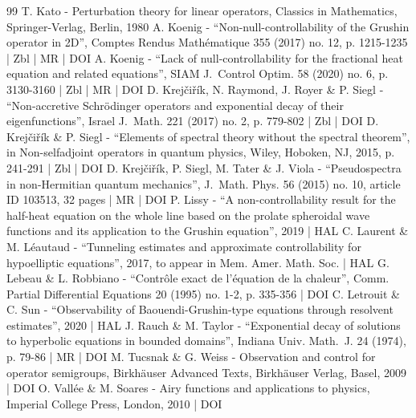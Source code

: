 \begin{thebibliography}{99}
T. Kato - Perturbation theory for linear operators, Classics in Mathematics, Springer-Verlag, Berlin, 1980
A. Koenig - “Non-null-controllability of the Grushin operator in 2D”, Comptes Rendus Mathématique 355 (2017) no. 12, p. 1215-1235 | Zbl | MR | DOI
A. Koenig - “Lack of null-controllability for the fractional heat equation and related equations”, SIAM J. Control Optim. 58 (2020) no. 6, p. 3130-3160 | Zbl | MR | DOI
D. Krejčiřík, N. Raymond, J. Royer \& P. Siegl - “Non-accretive Schrödinger operators and exponential decay of their eigenfunctions”, Israel J. Math. 221 (2017) no. 2, p. 779-802 | Zbl | DOI
D. Krejčiřík \& P. Siegl - “Elements of spectral theory without the spectral theorem”, in Non-selfadjoint operators in quantum physics, Wiley, Hoboken, NJ, 2015, p. 241-291 | Zbl | DOI
D. Krejčiřík, P. Siegl, M. Tater \& J. Viola - “Pseudospectra in non-Hermitian quantum mechanics”, J. Math. Phys. 56 (2015) no. 10, article ID 103513, 32 pages | MR | DOI
P. Lissy - “A non-controllability result for the half-heat equation on the whole line based on the prolate spheroidal wave functions and its application to the Grushin equation”, 2019 | HAL
C. Laurent \& M. Léautaud - “Tunneling estimates and approximate controllability for hypoelliptic equations”, 2017, to appear in Mem. Amer. Math. Soc. | HAL
G. Lebeau \& L. Robbiano - “Contrôle exact de l’équation de la chaleur”, Comm. Partial Differential Equations 20 (1995) no. 1-2, p. 335-356 | DOI
C. Letrouit \& C. Sun - “Observability of Baouendi-Grushin-type equations through resolvent estimates”, 2020 | HAL
J. Rauch \& M. Taylor - “Exponential decay of solutions to hyperbolic equations in bounded domains”, Indiana Univ. Math. J. 24 (1974), p. 79-86 | MR | DOI
M. Tucsnak \& G. Weiss - Observation and control for operator semigroups, Birkhäuser Advanced Texts, Birkhäuser Verlag, Basel, 2009 | DOI
O. Vallée \& M. Soares - Airy functions and applications to physics, Imperial College Press, London, 2010 | DOI
\end{thebibliography}
